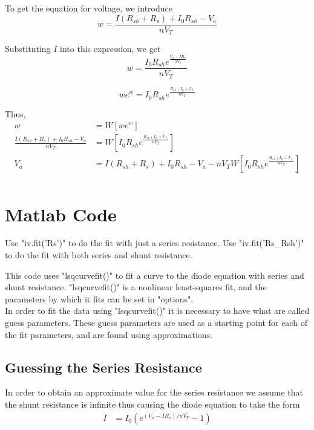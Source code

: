 \documentclass[12pt]{article}
\numberwithin{equation}{section}
\begin{document}
To get the equation for voltage,
we introduce
\begin{equation}
w = \frac{I (R_{sh} + R_s ) + I_0 R_{sh} - V_a}{n V_T}
\end{equation}

Substituting $I$ into this expression, we get
\begin{equation}
w = \frac{I_0 R_{sh} e^{\frac{V_a - I R_s}{n V_T}}}{n V_T}
\end{equation}

\begin{equation}
w e^w = I_0 R_{sh} e^{\frac{R_{sh} (I_0 + I)}{n V_T}}
\end{equation}

Thus,
\begin{align}
w &= W [ w e^w ] \\
\frac{I (R_{sh} + R_s ) + I_0 R_{sh} - V_a}{n V_T} &= W \left [ I_0 R_{sh} e^{\frac{R_{sh} (I_0 + I)}{n V_T}} \right ] \\
V_a &= I (R_{sh} + R_s ) + I_0 R_{sh} - V_a - n V_T W \left [ I_0 R_{sh} e^{\frac{R_{sh} (I_0 + I)}{n V_T}} \right ] \\
\end{align}




\section{Matlab Code}

Use "iv.fit('Rs')" to do the fit with just a series resistance.
Use "iv.fit('Rs_Rsh')" to do the fit with both series and shunt resistance.

This code uses "lsqcurvefit()" to fit a curve to the diode equation with series and shunt resistance. "lsqcurvefit()" is a nonlinear least-squares fit, and the parameters by which it fits can be set in "options".
\\ In order to fit the data using "lsqcurvefit()" it is necessary to have what are called guess parameters. These guess parameters are used as a starting point for each of the fit parameters, and are found using approximations.
\subsection{Guessing the Series Resistance}
In order to obtain an approximate value for the series resistance we assume that the shunt resistance is infinite thus causing the diode equation to take the form
\begin{align}
I &=  I_0 ( e^{(V_a - I R_s)/n V_T} - 1)\\
\end{align}
\end{document}

